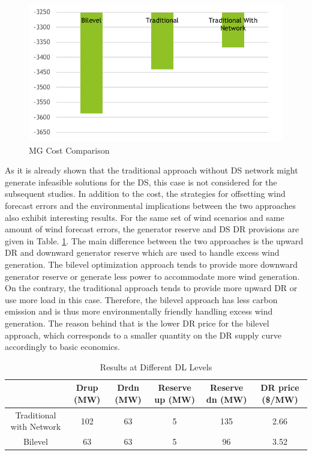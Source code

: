 \begin{figure}[H]
\centering
\includegraphics[scale=0.4]{1dsmg.png}
\caption{MG Cost Comparison}
\label{1dsmg}
\end{figure}

As it is already shown that the traditional approach without DS network might generate infeasible solutions for the DS, this case is not considered for the subsequent studies. In addition to the cost, the strategies for offsetting wind forecast errors and the environmental implications between the two approaches also exhibit interesting results. For the same set of wind scenarios and same amount of wind forecast errors, the generator reserve and DS DR provisions are given in Table. \ref{reserve}. The main difference between the two approaches is the upward DR and downward generator reserve which are used to handle excess wind generation. The bilevel optimization approach tends to provide more downward generator reserve or generate less power to accommodate more wind generation. On the contrary, the traditional approach tends to provide more upward DR or use more load in this case. Therefore, the bilevel approach has less carbon emission and is thus more environmentally friendly handling excess wind generation. The reason behind that is the lower DR price for the bilevel approach, which corresponds to a smaller quantity on the DR supply curve accordingly to basic economics. 

\begin{table}[H]
\centering
\begin{tabular}{ |c|c|c|c|c|c| } 
 \hline
& Drup (MW) & Drdn (MW) & Reserve up (MW) & Reserve dn (MW)&DR price (\$/MW)\\
 \hline
Traditional with Network & 102 & 63 & 5& 135 & 2.66 \\ 
 \hline
Bilevel & 63 & 63 & 5& 96 & 3.52 \\ 
 \hline
\end{tabular}
\caption{Results at Different DL Levels}
 \label{reserve}
\end{table}

